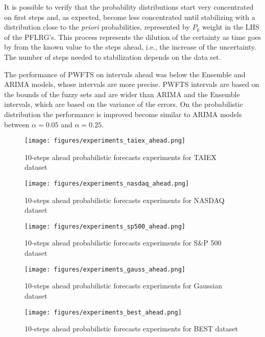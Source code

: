It is possible to verify that the probability distributions start very concentrated on first steps and, as expected, become less concentrated until stabilizing with a distribution close to the \textit{priori} probabilities, represented by $P_k$ weight in the LHS of the PFLRG's. This process represents the dilution of the certainty as time goes by from the known value to the steps ahead, i.e., the increase of the uncertainty. The number of steps needed to stabilization depends on the data set.

The performance of PWFTS on intervals ahead was below the Ensemble and ARIMA models, whose intervals are more precise. PWFTS intervals are based on the bounds of the fuzzy sets and are wider than ARIMA and the Ensemble intervals, which are based on the variance of the errors. On the probabilistic distribution the performance is improved become similar to ARIMA models between $\alpha = 0.05$ and $\alpha = 0.25$. 

\begin{figure}
\texttt{[image: figures/experiments\_taiex\_ahead.png]}
\caption{10-steps ahead probabilistic forecasts experiments for TAIEX dataset}
\label{fig:experiments_taiex_ahead}
\end{figure}

\begin{figure}
\texttt{[image: figures/experiments\_nasdaq\_ahead.png]}
\caption{10-steps ahead probabilistic forecasts experiments for NASDAQ dataset}
\label{fig:experiments_nasdaq_ahead}
\end{figure}

\begin{figure}
\texttt{[image: figures/experiments\_sp500\_ahead.png]}
\caption{10-steps ahead probabilistic forecasts experiments for S\&P 500 dataset}
\label{fig:experiments_sp500_ahead}
\end{figure}

\begin{figure}
\texttt{[image: figures/experiments\_gauss\_ahead.png]}
\caption{10-steps ahead probabilistic forecasts experiments for Gaussian dataset}
\label{fig:experiments_gauss_ahead}
\end{figure}

\begin{figure}
\texttt{[image: figures/experiments\_best\_ahead.png]}
\caption{10-steps ahead probabilistic forecasts experiments for BEST dataset}
\label{fig:experiments_best_ahead}
\end{figure}

